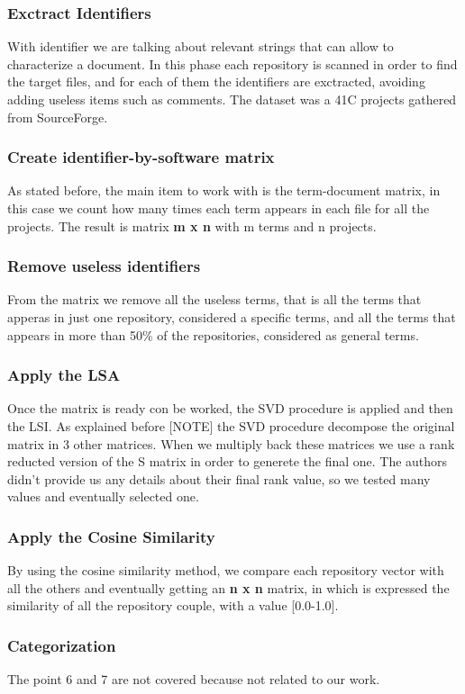 \subsubsection{Exctract Identifiers}
With identifier we are talking about relevant strings that can allow to characterize a document. In this phase each repository is scanned in order to find the target files, and for each of them the identifiers are exctracted, avoiding adding useless items such as comments. The dataset was a 41C projects gathered from SourceForge.

\subsubsection{Create identifier-by-software matrix}
As stated before, the main item to work with is the term-document matrix, in this case we count how many times each term appears in each file for all the projects. The result is matrix \textbf{m x n} with m terms and n projects.

\subsubsection{Remove useless identifiers}
From the matrix we remove all the useless terms, that is all the terms that apperas in just one repository, considered a specific terms, and all the terms that appears in more than 50\% of the repositories, considered as general terms.

\subsubsection{Apply the LSA}
Once the matrix is ready con be worked, the SVD procedure is applied and then the LSI. As explained before [NOTE] the SVD procedure decompose the original matrix in 3 other matrices. When we multiply back these matrices we use a rank reducted version of the S matrix in order to generete the final one. The authors didn't provide us any details about their final rank value, so we tested many values and eventually selected one.

\subsubsection{Apply the Cosine Similarity}
By using the cosine similarity method, we compare each repository vector with all the others and eventually getting an \textbf{n x n} matrix, in which is expressed the similarity of all the repository couple, with a value [0.0-1.0].

\subsubsection{Categorization}
The point 6 and 7 are not covered because not related to our work.

